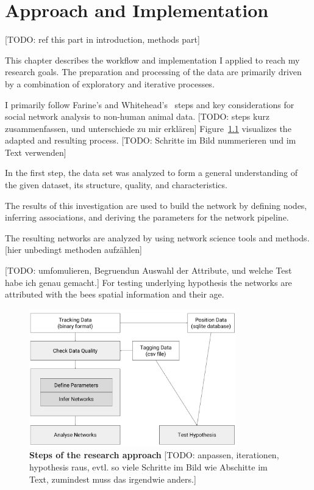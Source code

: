 \chapter{Approach and Implementation}
\label{ch:approach}
[TODO: ref this part in introduction, methods part]

This chapter describes the workflow and implementation I applied to reach my research goals.
The preparation and processing of the data are primarily driven by a combination of exploratory and iterative processes.

I primarily follow  Farine's and Whitehead's~\cite{farine2015constructing} steps and key considerations for social network analysis to non-human animal data.
[TODO: steps kurz zusammenfassen, und unterschiede zu mir erklären]
Figure~\ref{fig:process} visualizes the adapted and resulting process.
[TODO: Schritte im Bild nummerieren und im Text verwenden]

In the first step, the data set was analyzed to form a general understanding of the given dataset, its structure, quality, and characteristics.

The results of this investigation are used to build the network by defining nodes, inferring associations, and deriving the parameters for the network pipeline.

The resulting networks are analyzed by using network science tools and methods.
[hier unbedingt methoden aufzählen]																																																																																																						

[TODO: umfomulieren, Begruendun Auswahl der Attribute, und welche Test habe ich genau gemacht.]
For testing underlying hypothesis the networks are attributed with the bees spatial information and their age.

\begin{figure}[htb]
	\centering
	\includegraphics[width=0.8\textwidth]{Figures/process}
	\caption[Steps of the research approach]{\textbf{Steps of the research approach} [TODO: anpassen, iterationen, hypothesis raus, evtl. so viele Schritte im Bild wie Abschitte im Text, zumindest muss das irgendwie anders.]}
	\label{fig:process}
\end{figure}




